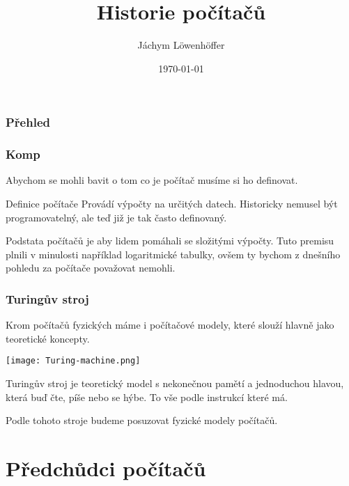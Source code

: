 \documentclass{beamer}
\title[amogus]{Historie počítačů} %
\author{Jáchym Löwenhöffer} %
\institute[GEVO] %
{
Gynekologická Evaluace Velkých Obrazů \\ %
\medskip
\textit{jachym.lowenhoffer@gmail.com} %
}
\date{\today} %
\begin{document}
\begin{frame}
	\titlepage %
\end{frame}

\begin{frame}
	\frametitle{Přehled} %
	\tableofcontents %
\end{frame}


\begin{frame}
	\frametitle{Komp}
Abychom se mohli bavit o tom co je počítač musíme si ho definovat.
  \begin{block}{Definice počítače}
	 Provádí výpočty na určitých datech. Historicky nemusel být programovatelný,
	 ale teď již je tak často definovaný.
	\end{block}
	Podstata počítačů je aby lidem pomáhali se složitými výpočty. Tuto premisu
	plnili v minulosti například logaritmické tabulky, ovšem ty bychom z dnešního
	pohledu za počítače považovat nemohli.
\end{frame}

\begin{frame}
 \frametitle{Turingův stroj}
 Krom počítačů fyzických máme i počítačové modely, které slouží hlavně jako
 teoretické koncepty.

 \centering
 \texttt{[image: Turing-machine.png]}

\raggedright

 Turingův stroj je teoretický model s nekonečnou pamětí a jednoduchou hlavou,
 která buď čte, píše nebo se hýbe. To vše podle instrukcí které má.

 Podle tohoto stroje budeme posuzovat fyzické modely počítačů.
\end{frame}

\section{Předchůdci počítačů}
\label{sec:fde-cycle}
\end{document}
